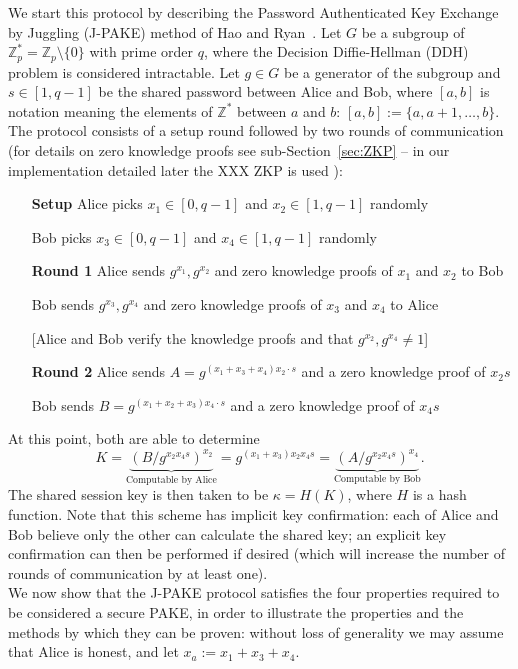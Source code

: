 We start this protocol by describing the Password Authenticated Key Exchange by Juggling (J-PAKE) method
of Hao and Ryan~\cite{HaRy2010}.  Let $G$ be a subgroup of $\mathbb{Z}_p^* = \mathbb{Z}_p \setminus \{0\}$ 
with prime order $q$, where the Decision Diffie-Hellman (DDH) problem is considered intractable.  Let $g\in G$
be a generator of the subgroup and $s \in [1,q-1]$ be the shared password between Alice and Bob, where 
$[a,b]$ is notation meaning the elements of $\mathbb{Z}^*$ between $a$ and $b$:  $[a,b] := \{a,a+1,\dots,b \}$.
\\

The protocol consists of a setup round followed by two rounds of communication (for details on zero knowledge
proofs see sub-Section~\ref{sec:ZKP} -- in our implementation detailed later the XXX ZKP is used ):
 \begin{itemize}
 \item[\textbf{Setup}] Alice picks $x_1 \in [0,q-1]$ and $x_2 \in [1,q-1]$ randomly
 \item[] Bob picks $x_3 \in [0,q-1]$ and $x_4 \in [1,q-1]$ randomly
 \item[]
 \item[\textbf{Round 1}] Alice sends $g^{x_1},g^{x_2}$ and zero knowledge proofs of $x_1$ and $x_2$ to Bob
 \item[] Bob sends $g^{x_3},g^{x_4}$ and zero knowledge proofs of $x_3$ and $x_4$ to Alice
 \item[] [Alice and Bob verify the knowledge proofs and that $g^{x_2},g^{x_4} \neq 1$]
 \item[]
 \item[\textbf{Round 2}] Alice sends $A = g^{(x_1+x_3+x_4)x_2\cdot s}$ and a zero knowledge proof of $x_2 s$
 \item[] Bob sends $B = g^{(x_1+x_2+x_3)x_4\cdot s}$ and a zero knowledge proof of $x_4 s$
 \item[]
 \end{itemize}

 At this point, both are able to determine 
 \[ K = \underbrace{\left(B / g^{x_2x_4 s} \right)^{x_2}}_\text{Computable by Alice} = g^{(x_1+x_3)x_2x_4s} = 
 \underbrace{\left(A / g^{x_2x_4 s} \right)^{x_4}}_\text{Computable by Bob}. \]
 The shared session key is then taken to be $\kappa = H(K)$, where $H$ is a hash function. 
   Note that this scheme has implicit key confirmation: each of Alice and 
 Bob believe only the other can calculate the shared key; an explicit key confirmation can then be 
 performed if desired (which will increase the number of rounds of communication by at least one).
 \\ 
 We now show that the J-PAKE protocol satisfies the four properties required to be considered a secure PAKE,
in order to illustrate the properties and the methods by which they can be proven:
without loss of generality we may assume that Alice is honest, and let $x_a := x_1+x_3+x_4$.  

